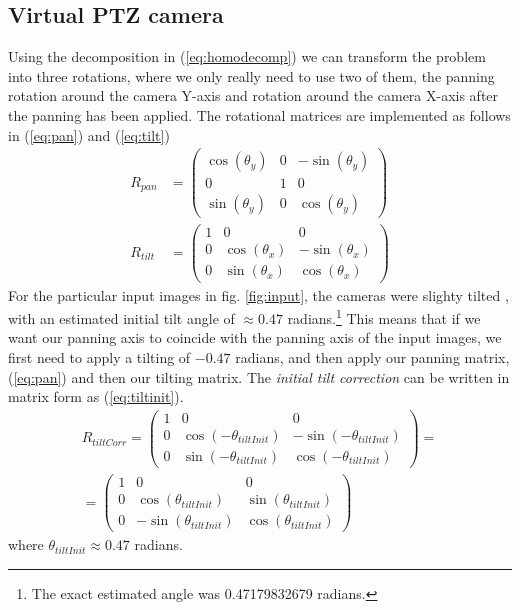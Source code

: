 \subsection{Virtual PTZ camera}
Using the decomposition in (\ref{eq:homodecomp}) we can transform the problem into three rotations, where we only really need to use two of them, the panning rotation around the camera Y-axis and rotation around the camera X-axis after the panning has been applied.
The rotational matrices are implemented as follows in (\ref{eq:pan}) and (\ref{eq:tilt})
	\begin{align}
		R_{pan}&=\begin{pmatrix}
			\cos(\theta_y) & 0 & -\sin(\theta_y) \\
			0 & 1 & 0 \\
			\sin(\theta_y) & 0 & \cos(\theta_y)
		\end{pmatrix} \label{eq:pan} \\
		R_{tilt} &=\begin{pmatrix}
			1 & 0 & 0 \\
			0 & \cos(\theta_x) & -\sin(\theta_x) \\
			0 & \sin(\theta_x) & \cos(\theta_x)
		\end{pmatrix} \label{eq:tilt}
	\end{align}
	For the particular input images in fig. \ref{fig:input}, the cameras were slighty tilted , with an estimated initial tilt angle of $\approx 0.47$ radians.\footnote{The exact estimated angle was 0.47179832679 radians.}
	This means that if we want our panning axis to coincide with the panning axis of the input images, we first need to apply a tilting of $-0.47$ radians, and then apply our panning matrix, (\ref{eq:pan}) and then our tilting matrix.
        The {\it initial tilt correction} can be written in matrix form as (\ref{eq:tiltinit}).
	\begin{multline}
		R_{tiltCorr}=\begin{pmatrix}
			1 & 0 & 0 \\
			0 & \cos(-\theta_{tiltInit}) & -\sin(-\theta_{tiltInit}) \\
			0 & \sin(-\theta_{tiltInit}) & \cos(-\theta_{tiltInit})
		\end{pmatrix} = \\
		=\begin{pmatrix}
			1 & 0 & 0 \\
			0 & \cos(\theta_{tiltInit}) & \sin(\theta_{tiltInit}) \\
			0 & -\sin(\theta_{tiltInit}) & \cos(\theta_{tiltInit})
		\end{pmatrix}
		\label{eq:tiltinit}
	\end{multline}
	where $\theta_{tiltInit} \approx 0.47$ radians.

